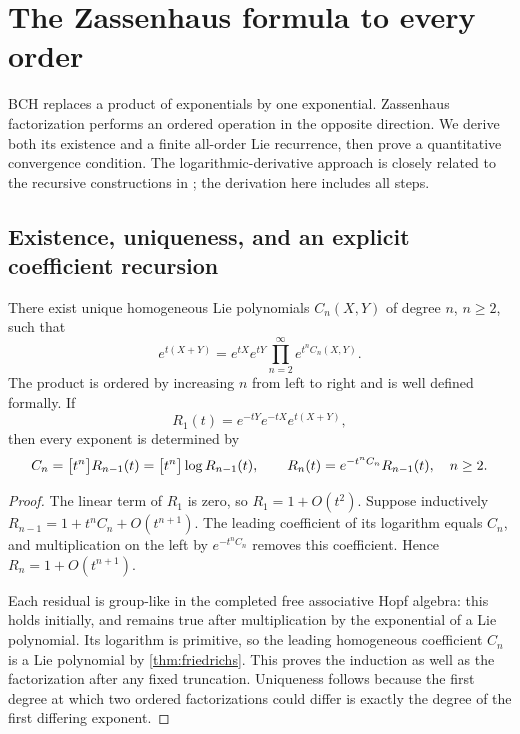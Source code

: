 \section{The Zassenhaus formula to every order}\label{sec:zassenhaus}
BCH replaces a product of exponentials by one exponential. Zassenhaus factorization performs an ordered operation in the opposite direction. We derive both its existence and a finite all-order Lie recurrence, then prove a quantitative convergence condition. The logarithmic-derivative approach is closely related to the recursive constructions in \cite{CasasMuruaNadinic}; the derivation here includes all steps.

\subsection{Existence, uniqueness, and an explicit coefficient recursion}
\begin{theorem}\label{thm:zassenhaus}
There exist unique homogeneous Lie polynomials $C_n(X,Y)$ of degree $n$, $n\geq2$, such that
\begin{equation}\label{eq:zassenhaus}
 \boxed{\displaystyle
 e^{t(X+Y)}=e^{tX}e^{tY}\prod_{n=2}^{\infty}e^{t^nC_n(X,Y)}.}
\end{equation}
The product is ordered by increasing $n$ from left to right and is well defined formally. If
\begin{equation}\label{eq:R1}
 R_1(t)=e^{-tY}e^{-tX}e^{t(X+Y)},
\end{equation}
then every exponent is determined by
\begin{equation}\label{eq:zass-residual}
 C_n=\bigl[t^n\bigr]R_{n-1}(t)
     =\bigl[t^n\bigr]\log R_{n-1}(t),\qquad
 R_n(t)=e^{-t^nC_n}R_{n-1}(t),\quad n\geq2.
\end{equation}
\end{theorem}
\begin{proof}
The linear term of $R_1$ is zero, so $R_1=1+O(t^2)$. Suppose inductively $R_{n-1}=1+t^nC_n+O(t^{n+1})$. The leading coefficient of its logarithm equals $C_n$, and multiplication on the left by $e^{-t^nC_n}$ removes this coefficient. Hence $R_n=1+O(t^{n+1})$.

Each residual is group-like in the completed free associative Hopf algebra: this holds initially, and remains true after multiplication by the exponential of a Lie polynomial. Its logarithm is primitive, so the leading homogeneous coefficient $C_n$ is a Lie polynomial by \cref{thm:friedrichs}. This proves the induction as well as the factorization after any fixed truncation. Uniqueness follows because the first degree at which two ordered factorizations could differ is exactly the degree of the first differing exponent.
\end{proof}
